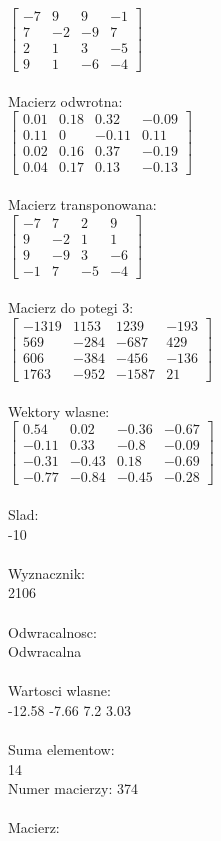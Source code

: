\documentclass[a4paper,12pt]{article}
\begin{document}
$\begin{bmatrix} -7&9&9&-1\\7&-2&-9&7\\2&1&3&-5\\9&1&-6&-4 \end{bmatrix}$
\\
\\
Macierz odwrotna:\\

$\begin{bmatrix} 0.01&0.18&0.32&-0.09\\0.11&0&-0.11&0.11\\0.02&0.16&0.37&-0.19\\0.04&0.17&0.13&-0.13 \end{bmatrix}$
\\
\\
Macierz transponowana:\\

$\begin{bmatrix} -7&7&2&9\\9&-2&1&1\\9&-9&3&-6\\-1&7&-5&-4 \end{bmatrix}$
\\
\\
Macierz do potegi 3:\\

$\begin{bmatrix} -1319&1153&1239&-193\\569&-284&-687&429\\606&-384&-456&-136\\1763&-952&-1587&21 \end{bmatrix}$
\\
\\
Wektory wlasne:\\

$\begin{bmatrix} 0.54&0.02&-0.36&-0.67\\-0.11&0.33&-0.8&-0.09\\-0.31&-0.43&0.18&-0.69\\-0.77&-0.84&-0.45&-0.28 \end{bmatrix}$
\\
\\
Slad:\\
-10
\\
\\
Wyznacznik:\\
2106
\\
\\
Odwracalnosc:\\
Odwracalna
\\
\\
Wartosci wlasne:\\
-12.58 -7.66 7.2 3.03
\\
\\
Suma elementow:\\
14
\\
\newpage
Numer macierzy:
374
\\
\\
Macierz:\\
\end{document}
